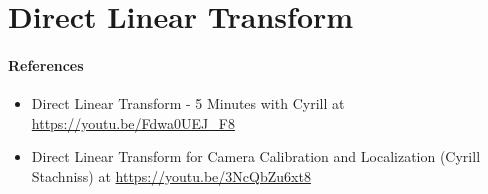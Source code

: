 
\section{Direct Linear Transform}

\paragraph{References}
\begin{itemize}
    \item Direct Linear Transform - 5 Minutes with Cyrill at \url{https://youtu.be/Fdwa0UEJ_F8}
    \item Direct Linear Transform for Camera Calibration and Localization (Cyrill Stachniss) at \url{https://youtu.be/3NcQbZu6xt8}
\end{itemize}

